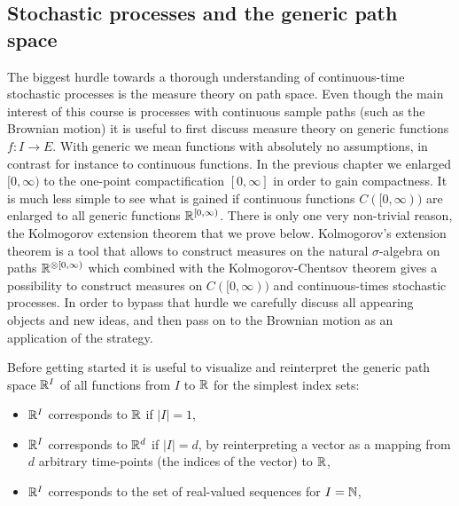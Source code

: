 \subsection{Stochastic processes and the generic path space}
The biggest hurdle towards a thorough understanding of continuous-time stochastic processes is the measure theory on path space. Even though the main interest of this course is processes with continuous sample paths (such as the Brownian motion) it is useful to first discuss measure theory on generic functions $f:I\to E$. With generic we mean functions with absolutely no assumptions, in contrast for instance to continuous functions. In the previous chapter we enlarged $[0,\infty)$ to the one-point compactification $[0,\infty]$ in order to gain compactness. It is much less simple to see what is gained if continuous functions $C([0,\infty))$ are enlarged to all generic functions $\mathbb{R}^{[0,\infty)}$. There is only one very non-trivial reason, the Kolmogorov extension theorem that we prove below. Kolmogorov's extension theorem is a tool that allows to construct measures on the natural $\sigma$-algebra on paths $\mathbb{R}^{\otimes [0,\infty)}$ which combined with the Kolmogorov-Chentsov theorem gives a possibility to construct measures on $C([0,\infty))$ and continuous-times stochastic processes. In order to bypass that hurdle we carefully discuss all appearing objects and new ideas, and then pass on to the Brownian motion as an application of the strategy. \smallskip




Before getting started it is useful to visualize and reinterpret the generic path space $\mathbb{R}^I$ of all functions from $I$ to $\mathbb{R}$ for the simplest index sets:
\begin{itemize}
	\item $\mathbb{R}^I$ corresponds to $\mathbb{R}$ if $|I|=1$,
	\item $\mathbb{R}^I$ corresponds to $\mathbb{R}^d$ if $|I|=d$, by reinterpreting a vector as a mapping from $d$ arbitrary time-points (the indices of the vector) to $\mathbb{R}$,
	\item $\mathbb{R}^I$ corresponds to the set of real-valued sequences for $I=\mathbb{N}$,
\end{itemize}

